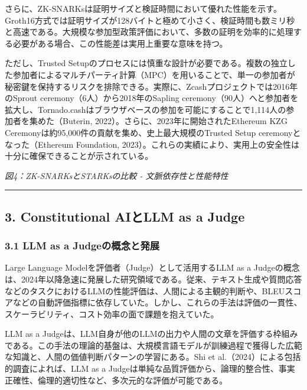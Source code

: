 さらに、ZK-SNARKsは証明サイズと検証時間において優れた性能を示す。Groth16方式では証明サイズが128バイトと極めて小さく、検証時間も数ミリ秒と高速である。大規模な参加型政策評価において、多数の証明を効率的に処理する必要がある場合、この性能差は実用上重要な意味を持つ。

ただし、Trusted Setupのプロセスには慎重な設計が必要である。複数の独立した参加者によるマルチパーティ計算（MPC）を用いることで、単一の参加者が秘密鍵を保持するリスクを排除できる。実際に、Zcashプロジェクトでは2016年のSprout ceremony（6人）から2018年のSapling ceremony（90人）へと参加者を拡大し、Tornado.cashはブラウザベースの参加を可能にすることで1,114人の参加者を集めた（Buterin, 2022）。さらに、2023年に開始されたEthereum KZG Ceremonyは約95,000件の貢献を集め、史上最大規模のTrusted Setup ceremonyとなった（Ethereum Foundation, 2023）。これらの実績により、実用上の安全性は十分に確保できることが示されている。

\pandocbounded{}
\emph{図4：ZK-SNARKsとSTARKsの比較 - 文脈依存性と性能特性}

\begin{center}\rule{0.5\linewidth}{0.5pt}\end{center}

\subsection{3. Constitutional AIとLLM as a Judge}\label{constitutional-aiux3068llm-as-a-judge}

\subsubsection{3.1 LLM as a Judgeの概念と発展}\label{llm-as-a-judgeux306eux6982ux5ff5ux3068ux767aux5c55}

Large Language Modelを評価者（Judge）として活用するLLM as a Judgeの概念は、2024年以降急速に発展した研究領域である。従来、テキスト生成や質問応答などのタスクにおけるLLMの性能評価は、人間による主観的判断や、BLEUスコアなどの自動評価指標に依存していた。しかし、これらの手法は評価の一貫性、スケーラビリティ、コスト効率の面で課題を抱えていた。

LLM as a Judgeは、LLM自身が他のLLMの出力や人間の文章を評価する枠組みである。この手法の理論的基盤は、大規模言語モデルが訓練過程で獲得した広範な知識と、人間の価値判断パターンの学習にある。Shi et al.（2024）による包括的調査によれば、LLM as a Judgeは単純な品質評価から、論理的整合性、事実正確性、倫理的適切性など、多次元的な評価が可能である。

